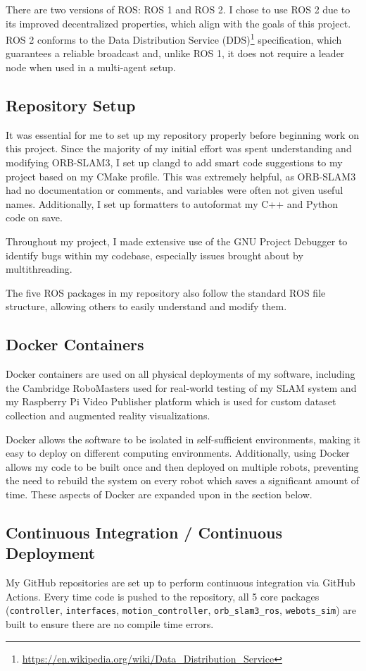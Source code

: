 There are two versions of ROS: ROS 1 and ROS 2. I chose to use ROS 2 due to its improved decentralized properties, which align with the goals of this project. ROS 2 conforms to the Data Distribution Service (DDS)\footnote[1]{\url{https://en.wikipedia.org/wiki/Data_Distribution_Service}} specification, which guarantees a reliable broadcast and, unlike ROS 1, it does not require a leader node when used in a multi-agent setup.

\subsection{Repository Setup}
\label{sec:repository-setup}
It was essential for me to set up my repository properly before beginning work on this project. Since the majority of my initial effort was spent understanding and modifying ORB-SLAM3, I set up clangd to add smart code suggestions to my project based on my CMake profile. This was extremely helpful, as ORB-SLAM3 had no documentation or comments, and variables were often not given useful names. Additionally, I set up formatters to autoformat my C++ and Python code on save.

Throughout my project, I made extensive use of the GNU Project Debugger to identify bugs within my codebase, especially issues brought about by multithreading.

The five ROS packages in my repository also follow the standard ROS file structure, allowing others to easily understand and modify them.

\subsection{Docker Containers}
\label{sec:docker-containers}
Docker containers are used on all physical deployments of my software, including the Cambridge RoboMasters used for real-world testing of my SLAM system and my Raspberry Pi Video Publisher platform which is used for custom dataset collection and augmented reality visualizations.

Docker allows the software to be isolated in self-sufficient environments, making it easy to deploy on different computing environments. Additionally, using Docker allows my code to be built once and then deployed on multiple robots, preventing the need to rebuild the system on every robot which saves a significant amount of time. These aspects of Docker are expanded upon in the section below.

\subsection{Continuous Integration / Continuous Deployment}
\label{sec:cicd}
My GitHub repositories are set up to perform continuous integration via GitHub Actions. Every time code is pushed to the repository, all 5 core packages (\texttt{controller}, \texttt{interfaces}, \texttt{motion\_controller}, \texttt{orb\_slam3\_ros}, \texttt{webots\_sim}) are built to ensure there are no compile time errors.

